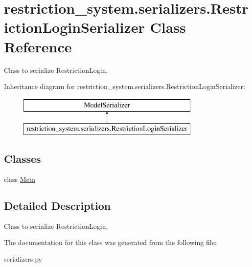 \hypertarget{classrestriction__system_1_1serializers_1_1RestrictionLoginSerializer}{}\section{restriction\+\_\+system.\+serializers.\+Restriction\+Login\+Serializer Class Reference}
\label{classrestriction__system_1_1serializers_1_1RestrictionLoginSerializer}


Class to serialize Restriction\+Login.  


Inheritance diagram for restriction\+\_\+system.\+serializers.\+Restriction\+Login\+Serializer\+:\begin{figure}[H]
\begin{center}
\leavevmode
\includegraphics[height=2.000000cm]{classrestriction__system_1_1serializers_1_1RestrictionLoginSerializer}
\end{center}
\end{figure}
\subsection*{Classes}
\begin{DoxyCompactItemize}
\item 
class \hyperlink{classrestriction__system_1_1serializers_1_1RestrictionLoginSerializer_1_1Meta}{Meta}
\end{DoxyCompactItemize}


\subsection{Detailed Description}
Class to serialize Restriction\+Login. 

The documentation for this class was generated from the following file\+:\begin{DoxyCompactItemize}
\item 
serializers.\+py\end{DoxyCompactItemize}
